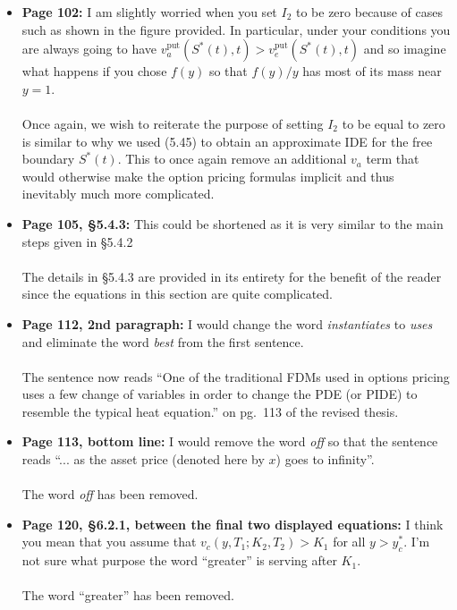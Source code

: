 \documentclass{article}
\begin{document}
\begin{enumerate}
\begin{itemize}
			\item{\textbf{Page 102: } I am slightly worried when you set $I_2$ to be zero because of cases such as shown in the figure provided. In particular, under your conditions you are always going to have $v_a^{\text{put}}(S^*(t),t) > v_e^{\text{put}}(S^*(t),t)$ and so imagine what happens if you chose $f(y)$ so that $f(y)/y$ has most of its mass near $y=1$.
			\\\\}
			Once again, we wish to reiterate the purpose of setting $I_2$ to be equal to zero is similar to why we used (5.45) to obtain an approximate IDE for the free boundary $S^*(t)$. This to once again remove an additional $v_a$ term that would otherwise make the option pricing formulas implicit and thus inevitably much more complicated.
			
			\item{\textbf{Page 105, \S5.4.3: } This could be shortened as it is very similar to the main steps given in \S5.4.2
			\\\\}
			The details in \S5.4.3 are provided in its entirety for the benefit of the reader since the equations in this section are quite complicated.
			
			\item{\textbf{Page 112, 2nd paragraph: } I would change the word \emph{instantiates} to \emph{uses} and eliminate the word \emph{best} from the first sentence.
			\\\\}
			The sentence now reads ``One of the traditional FDMs used in options pricing uses a few change of variables in order to change the PDE (or PIDE) to resemble the typical heat equation.'' on pg.~113 of the revised thesis.
			
			\item{\textbf{Page 113, bottom line: } I would remove the word \emph{off} so that the sentence reads ``... as the asset price (denoted here by $x$) goes to infinity''.
			\\\\}
			The word \emph{off} has been removed.
			
			\item{\textbf{Page 120, \S6.2.1, between the final two displayed equations: } I think you mean that you assume that $v_c(y,T_1; K_2, T_2) > K_1$ for all $y > y_c^*$. I'm not sure what purpose the word ``greater'' is serving after $K_1$.
			\\\\}
			The word ``greater'' has been removed.
			

\end{itemize}
\end{enumerate}
\end{document}
